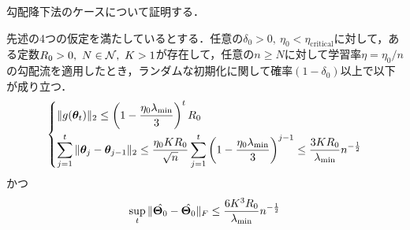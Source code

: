 勾配降下法のケースについて証明する．
\begin{thm}[勾配降下法]
    先述の4つの仮定を満たしているとする．任意の$\delta_0 > 0, \ \eta_0 < \eta_{\mathrm{critical}}$に対して，ある定数$R_0 > 0, \ N \in \mathcal{N}, \ K > 1$が存在して，任意の$n \geq N$に対して学習率$\eta = \eta_0 / n$の勾配流を適用したとき，ランダムな初期化に関して確率$(1- \delta_0)$以上で以下が成り立つ．
    \begin{align}
        \label{eq:a3_1}
        \begin{dcases}
            \|g(\bm{\theta}_t)\|_2 \leq \left(1 - \dfrac{\eta_0 \lambda_{\min}}{3}\right)^t R_0 \\
            \sum_{j=1}^t \|\bm{\theta}_j - \bm{\theta}_{j-1}\|_2 \leq \dfrac{\eta_0 KR_0}{\sqrt{n}} \sum_{j=1}^t \left(1 - \dfrac{\eta_0 \lambda_{\min}}{3}\right)^{j-1} \leq \dfrac{3KR_0}{\lambda_{\min}}n^{-\frac{1}{2}}
        \end{dcases}
    \end{align}
    かつ
    \begin{align}
        \label{eq:a3_2}
        \sup_t \|\hat{\bm{\Theta}_0} - \hat{\bm{\Theta}_0}\|_F \leq \dfrac{6K^3 R_0}{\lambda_{\min}}n^{-\frac{1}{2}}
    \end{align}
\end{thm}

